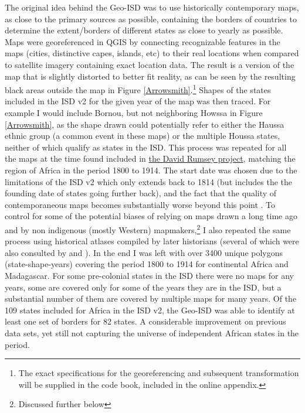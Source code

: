 \documentclass[12pt]{article}
\begin{document}
The original idea behind the Geo-ISD was to use historically contemporary maps,
as close to the primary sources as possible, containing the borders of countries
to determine the extent/borders of different states as close to yearly as
possible. Maps were georeferenced in QGIS by connecting recognizable features in
the maps (cities, distinctive capes, islands, etc) to their real locations when
compared to satellite imagery containing exact location data.  The result is a
version of the map that is slightly distorted to better fit reality, as can be
seen by the resulting black areas outside the map in Figure
\ref{Arrowsmith}.\footnote{The exact specifications for the georeferencing and
	subsequent transformation will be supplied in the code book, included in
the online appendix.} Shapes of the states included in the ISD v2 for the given
year of the map was then traced. For example I would include Bornou, but not
neighboring Howssa in Figure \ref{Arrowsmith}, as the shape drawn could
potentially refer to either the Haussa ethnic group (a common event in these
maps) or the multiple Houssa states, neither of which qualify as states in the
ISD. This process was repeated for all the maps at the time found included in
\href{https://www.davidrumsey.com}{the David Rumsey project}, matching the
region of Africa in the period 1800 to 1914. The start date was chosen due to the
limitations of the ISD v2 which only extends back to 1814 (but includes the the
founding date of states going further back), and the fact that the quality of
contemporaneous maps becomes substantially  worse beyond this point
\citep{Bassett_1994}. To control for some of the potential biases of relying on
maps drawn a long time ago and by non indigenous (mostly Western)
mapmakers,\footnote{Discussed further below} I also repeated the same process
using historical atlases compiled by later historians (several of which were
also consulted by \citet{Depetris-Chauvin2016} and \citet{Paine2019}). In the
end I was left with over 3400 unique polygons (state-shape-years) covering the
period 1800 to 1914 for continental Africa and Madagascar. For some pre-colonial
states in the ISD there were no maps for any years, some are covered only for
some of the years they are in the ISD, but a substantial number of them are
covered by multiple maps for many years. Of the 109 states included for Africa
in the ISD v2, the Geo-ISD was able to identify at least one set of borders for
82 states. A considerable improvement on previous data sets, yet still not
capturing the universe of independent African states in the period.
\end{document}
